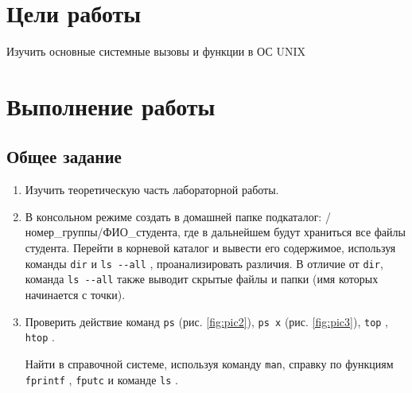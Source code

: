 \section{Цели работы}
\label{sec:target}

Изучить основные системные вызовы и функции в ОС UNIX

\section{Выполнение работы}
\label{sec:job} 
\subsection{Общее задание}
\label{sec:job:general_task}

\begin{enumerate}[listparindent=\fivecharsapprox]

	\item Изучить теоретическую часть лабораторной работы.
	\item В консольном режиме создать в домашней папке подкаталог: /номер\_группы/ФИО\_студента, где в дальнейшем будут храниться все файлы студента.
		Перейти в корневой каталог и вывести его содержимое, используя команды \lstinline{dir} и \lstinline{ls --all} , проанализировать различия.
В отличие от \lstinline{dir}, команда \lstinline{ls --all} также выводит скрытые файлы и папки (имя которых начинается с точки).


	\item Проверить действие команд \lstinline{ps} (рис. \ref{fig:pic2}), \lstinline{ps x} (рис. \ref{fig:pic3}), \lstinline{top} , \lstinline{htop} .


Найти в справочной системе, используя команду \lstinline{man}, справку по функциям \lstinline{fprintf} , \lstinline{fputc}  и команде \lstinline{ls} .



\end{enumerate}
